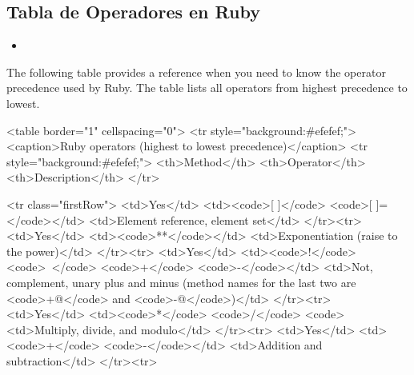 \subsection{Tabla de Operadores en Ruby}
\begin{itemize}
\item
{}
\end{itemize}
The following table provides a reference when you need to know the
operator precedence used by Ruby. The table lists all operators from
highest precedence to lowest.

\begin{rawhtml}
<table border="1" cellspacing="0">
<tr style="background:#efefef;">
        <caption>Ruby operators (highest to lowest precedence)</caption>
<tr style="background:#efefef;">
                <th>Method</th>
                <th>Operator</th>
                <th>Description</th>
        </tr>

        <tr class="firstRow">
                        <td>Yes</td>
                <td><code>[ ]</code> <code>[ ]=</code></td>
                <td>Element reference, element set</td>
        </tr><tr>
                <td>Yes</td>
                <td><code>**</code></td>
                <td>Exponentiation (raise to the power)</td>
        </tr><tr>
                <td>Yes</td>
                <td><code>!</code> <code>~</code> <code>+</code> <code>-</code></td>
                <td>Not, complement, unary plus and minus (method names for the last two are <code>+@</code> and <code>-@</code>)</td>
        </tr><tr>
                <td>Yes</td>
                <td><code>*</code> <code>/</code> <code>%
                <td>Multiply, divide, and modulo</td>
        </tr><tr>
                <td>Yes</td>
                <td><code>+</code> <code>-</code></td>
                <td>Addition and subtraction</td>
        </tr><tr>


\end{rawhtml}
